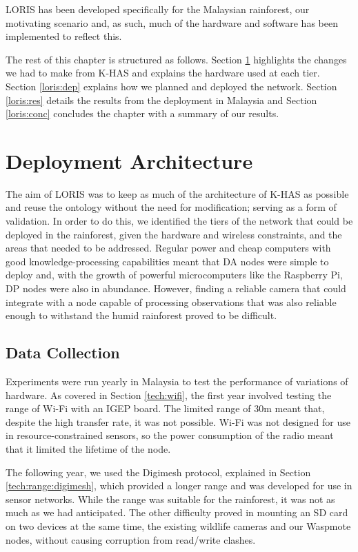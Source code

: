 	LORIS has been developed specifically for the Malaysian rainforest, our motivating scenario and, as such, much of the hardware and software has been implemented to reflect this.
	
	The rest of this chapter is structured as follows. Section \ref{loris:arch} highlights the changes we had to make from K-HAS and explains the hardware used at each tier. Section \ref{loris:dep} explains how we planned and deployed the network. Section \ref{loris:res} details the results from the deployment in Malaysia and Section \ref{loris:conc} concludes the chapter with a summary of our results.
	
	\section{ Deployment Architecture}\label{loris:arch}
		The aim of LORIS was to keep as much of the architecture of K-HAS as possible and reuse the ontology without the need for modification; serving as a form of validation. In order to do this, we identified the tiers of the network that could be deployed in the rainforest, given the hardware and wireless constraints, and the areas that needed to be addressed. Regular power and cheap computers with good knowledge-processing capabilities meant that DA nodes were simple to deploy and, with the growth of powerful microcomputers like the Raspberry Pi, DP nodes were also in abundance. However, finding a reliable camera that could integrate with a node capable of processing observations that was also reliable enough to withstand the humid rainforest proved to be difficult.
		
		\subsection{Data Collection}
				Experiments were run yearly in Malaysia to test the performance of variations of hardware. As covered in Section \ref{tech:wifi}, the first year involved testing the range of Wi-Fi with an IGEP board. The limited range of 30m meant that, despite the high transfer rate, it was not possible. Wi-Fi was not designed for use in resource-constrained sensors, so the power consumption of the radio meant that it limited the lifetime of the node.
				
				The following year, we used the Digimesh protocol, explained in Section \ref{tech:range:digimesh}, which provided a longer range and was developed for use in sensor networks.  While the range was suitable for the rainforest, it was not as much as we had anticipated. The other difficulty proved in mounting an SD card on two devices at the same time, the existing wildlife cameras and our Waspmote nodes, without causing corruption from read/write clashes.
				
